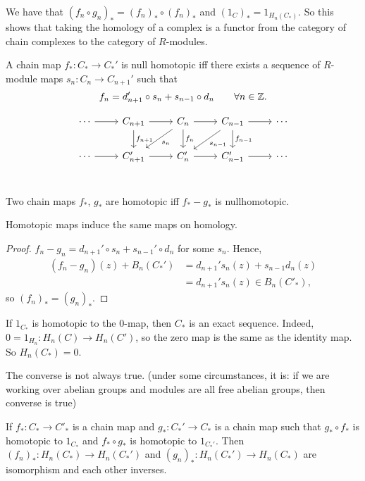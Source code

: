 We have that $(f_n  \circ  g_n)_* = (f_n)_*  \circ  (f_n)_*$ and $(1_C)_* = 1_{H_n(C_*)}$.
So this shows that taking the homology of a complex is a functor from the category of chain complexes to the category of $R$-modules.

\begin{definition}
    A chain map $f_*: C_* \to  C_*'$ is null homotopic iff there exists a sequence of $R$-module maps $s_n: C_{n} \to  C_{n+1}'$ such that 
    \[
        f_n = d_{n+1} ' \circ  s_n + s_{n-1}  \circ  d_n \qquad \forall  n \in \mathbb{Z}
    .\] 

    \[
        \begin{tikzcd}
            \cdots \arrow[r, ""] &  C_{n+1} \arrow[d, "f_{n+1}"]\arrow[r, ""]  &C_n \arrow[d, "f_n"]\arrow[r, ""] \arrow[dl, "s_n"]& \arrow[d, "f_{n-1}"]C_{n-1} \arrow[r, ""] \arrow[dl, "s_{n-1}"]& \cdots\\
            \cdots \arrow[r, " "] & C'_{n+1} \arrow[r, ""]  &C'_n \arrow[r, ""] & C'_{n-1} \arrow[r, ""] & \cdots\\
        \end{tikzcd}
    \]
\end{definition}
\begin{definition}
    Two chain maps $f_*$, $g_*$ are homotopic iff $f_* - g_*$ is nullhomotopic.
\end{definition}

\begin{prop}
Homotopic maps induce the same maps on homology.
\end{prop}
\begin{proof}
    $f_n - g_n = d_{n+1}'  \circ s_n + s_{n-1}'  \circ  d_n$ for some $s_n$.
    Hence,
     \begin{align*}
         (f_n - g_n) (z) + B_n(C_*')
         &= d_{n+1}' s_n(z) + s_{n-1} d_n(z)\\
         &= d_{n+1}' s_n(z) \in B_n(C'_*)
    ,\end{align*} 
    so $(f_n)_* = (g_n)_*$.
\end{proof}

\begin{remark}
    If $1_{C_*}$ is homotopic to the $0$-map, then $C_*$ is an exact sequence.
    Indeed, $0 = 1_{H_n}: H_n(C) \to H_n(C')$, so the zero map is the same as the identity map.
    So $H_n(C_*) = 0$.

    The converse is not always true. (under some circumstances, it is: if we are working over abelian groups and modules are all free abelian groups, then converse is true)
\end{remark}
\begin{remark}
    If $f_*: C_* \to  C'_*$ is a chain map and $g_*: C_*' \to  C_*$ is a chain map such that
    $ g_*  \circ  f_* $ is homotopic to $1_{C_*}$ and $f_*  \circ  g_*$ is homotopic to $1_{C_*'}$.
    Then $(f_n)_*: H_n(C_*) \to H_n(C_*')$ and $(g_n)_*:H_n(C_*') \to  H_n(C_*)$ are isomorphism and each other inverses.
\end{remark}

